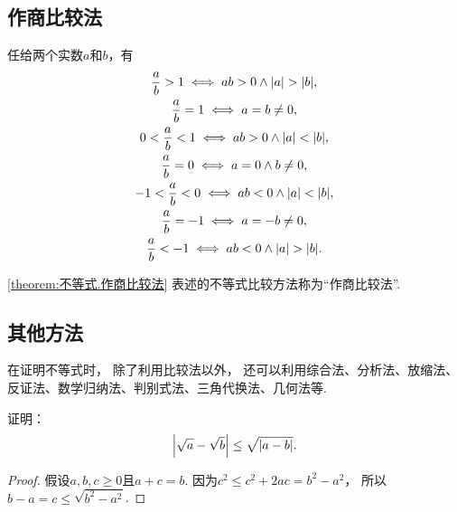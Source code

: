 \subsection{作商比较法}
\begin{theorem}\label{theorem:不等式.作商比较法}
任给两个实数\(a\)和\(b\)，有\begin{gather}
	\frac{a}{b} > 1 \iff ab > 0 \land \abs{a} > \abs{b}, \\
	\frac{a}{b} = 1 \iff a = b \neq 0, \\
	0 < \frac{a}{b} < 1 \iff ab > 0 \land \abs{a} < \abs{b}, \\
	\frac{a}{b} = 0 \iff a = 0 \land b \neq 0, \\
	-1 < \frac{a}{b} < 0 \iff ab < 0 \land \abs{a} < \abs{b}, \\
	\frac{a}{b} = -1 \iff a = -b \neq 0, \\
	\frac{a}{b} < -1 \iff ab < 0 \land \abs{a} > \abs{b}.
\end{gather}
\end{theorem}
\cref{theorem:不等式.作商比较法} 表述的不等式比较方法称为“作商比较法”.

\subsection{其他方法}
在证明不等式时，
除了利用比较法以外，
还可以利用综合法、分析法、放缩法、反证法、数学归纳法、判别式法、三角代换法、几何法等.

\begin{example}
证明：\begin{equation}\label{equation:不等式.根式差的绝对值的不等式}
	\abs{\sqrt{a}-\sqrt{b}} \leq \sqrt{\abs{a-b}}.
\end{equation}
\begin{proof}
假设\(a,b,c\geq0\)且\(a+c=b\).
因为\(c^2 \leq c^2+2ac = b^2-a^2\)，
所以\(b-a = c \leq \sqrt{b^2-a^2}\).
\end{proof}
\end{example}
